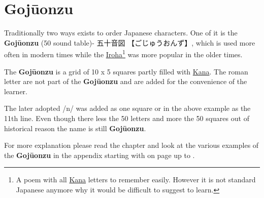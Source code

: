 \section{Gojūonzu} 
\label{sec:Gojuonzu}

Traditionally two ways exists to order Japanese characters. One of it is the
\textbf{Gojūonzu} (50 sound table)-  {五十音図}   {【ごじゅうおんず}】, which
is used more often in modern times while the
\hyperref[sec:Iroha]{Iroha}\footnote{A poem with all \hyperref[sec:Kana]{Kana}
letters to remember easily. However it is not standard Japanese anymore why it
would be difficult to suggest to learn. } was more popular in the older times.

The \textbf{Gojūonzu} is a grid of 10 x 5 squares partly filled with
\hyperref[sec:Kana]{Kana}. The roman letter are not part of the
\textbf{Gojūonzu} and are added for the convenience of the learner. 



The later adopted /n/ was added as one square or in the above example as the
11th line.  Even though there less the 50 letters and more the 50 squares out
of historical reason the name is still \textbf{Gojūonzu}.

For more explanation please read the chapter
 and look at the various examples of the
\textbf{Gojūonzu} in the appendix starting with 
on page \pageref{chap:KatakanaTables} up to \pageref{sec:KatakanaMikachanPB}.

